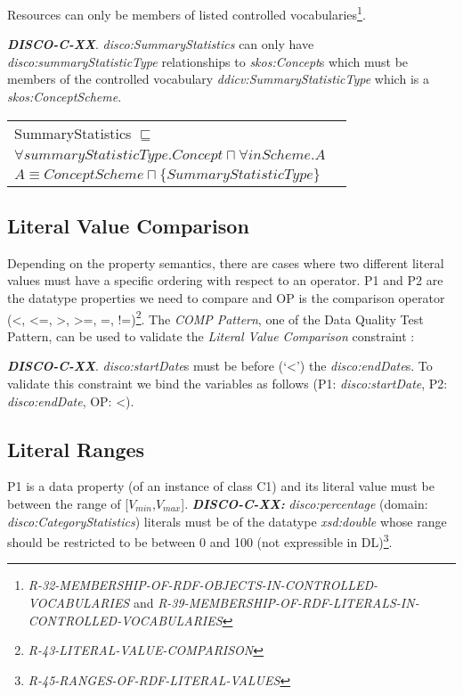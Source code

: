\documentclass{elsart3p}    %
\newenvironment{DL}{
  \vspace{0cm}
  \begin{tabular}{l l}

}{
  \end{tabular}
}
\begin{document}
Resources can only be members of listed controlled vocabularies\footnote{{\em R-32-MEMBERSHIP-OF-RDF-OBJECTS-IN-CONTROLLED-VOCABULARIES} and
{\em R-39-MEMBERSHIP-OF-RDF-LITERALS-IN-CONTROLLED-VOCABULARIES}}.

\textbf{{\em DISCO-C-XX}}.
{\em disco:SummaryStatistics} can only have {\em disco:summaryStatisticType} relationships to {\em skos:Concept}s which must be members of the controlled vocabulary {\em ddicv:SummaryStatisticType} which is a {\em skos:ConceptScheme}.

\begin{DL}
SummaryStatistics $\sqsubseteq$ \\
$\forall summaryStatisticType.Concept \sqcap \forall inScheme . A$ \\
$A \equiv ConceptScheme \sqcap \{SummaryStatisticType\}$
\end{DL}

\subsection{Literal Value Comparison}

Depending on the property semantics,
there are cases where two different literal values must have
a specific ordering with respect to an operator. 
P1 and P2 are the datatype properties we need to compare and 
OP is the comparison operator (\textless, \textless=, \textgreater, \textgreater=, =, !=)\footnote{{\em R-43-LITERAL-VALUE-COMPARISON}}.
The {\em COMP Pattern}, one of the Data Quality Test Pattern, can be used to validate the {\em Literal Value Comparison} constraint \cite{Kontokostas2014}:


\textbf{{\em DISCO-C-XX}}.
{\em disco:startDate}s must be before (‘\textless’) the {\em disco:endDate}s.
To validate this constraint we bind the variables as follows (P1: {\em disco:startDate}, P2: {\em disco:endDate}, OP: \textless). 

\subsection{Literal Ranges}

P1 is a data property (of an instance of class C1) and its literal value must be between the range of [$V_{min}$,$V_{max}$].
\textbf{{\em DISCO-C-XX:}}
{\em disco:percentage} (domain: {\em disco:CategoryStatistics}) literals must be of the datatype {\em xsd:double} whose range should be restricted to be between 0 and 100 (not expressible in DL)\footnote{{\em R-45-RANGES-OF-RDF-LITERAL-VALUES}}.
\end{document}
